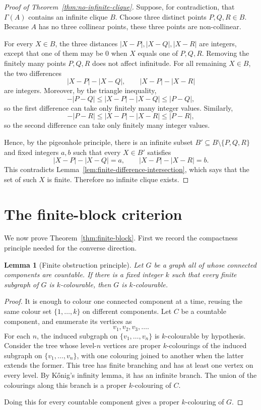 \documentclass[11pt,a4paper]{amsart}
\newtheorem{lemma}[theorem]{Lemma}
\theoremstyle{definition}
\begin{document}
\begin{proof}[Proof of Theorem~\ref{thm:no-infinite-clique}]
Suppose, for contradiction, that $\Gamma(A)$ contains an infinite clique $B$.  Choose three distinct points $P,Q,R\in B$.  Because $A$ has no three collinear points, these three points are non-collinear.

For every $X\in B$, the three distances $|X-P|,|X-Q|,|X-R|$ are integers, except that one of them may be $0$ when $X$ equals one of $P,Q,R$.  Removing the finitely many points $P,Q,R$ does not affect infinitude.  For all remaining $X\in B$, the two differences
\[
        |X-P|-|X-Q|,
        \qquad
        |X-P|-|X-R|
\]
are integers.  Moreover, by the triangle inequality,
\[
        -|P-Q|\leq |X-P|-|X-Q|\leq |P-Q|,
\]
so the first difference can take only finitely many integer values.  Similarly,
\[
        -|P-R|\leq |X-P|-|X-R|\leq |P-R|,
\]
so the second difference can take only finitely many integer values.

Hence, by the pigeonhole principle, there is an infinite subset $B'\subseteq B\setminus\{P,Q,R\}$ and fixed integers $a,b$ such that every $X\in B'$ satisfies
\[
        |X-P|-|X-Q|=a,
        \qquad
        |X-P|-|X-R|=b.
\]
This contradicts Lemma~\ref{lem:finite-difference-intersection}, which says that the set of such $X$ is finite.  Therefore no infinite clique exists.
\end{proof}

\section{The finite-block criterion}

We now prove Theorem~\ref{thm:finite-block}.  First we record the compactness principle needed for the converse direction.

\begin{lemma}[Finite obstruction principle]\label{lem:finite-obstruction}
Let $G$ be a graph all of whose connected components are countable.  If there is a fixed integer $k$ such that every finite subgraph of $G$ is $k$-colourable, then $G$ is $k$-colourable.
\end{lemma}

\begin{proof}
It is enough to colour one connected component at a time, reusing the same colour set $\{1,\ldots,k\}$ on different components.  Let $C$ be a countable component, and enumerate its vertices as
\[
        v_1,v_2,v_3,\ldots .
\]
For each $n$, the induced subgraph on $\{v_1,\ldots,v_n\}$ is $k$-colourable by hypothesis.  Consider the tree whose level-$n$ vertices are proper $k$-colourings of the induced subgraph on $\{v_1,\ldots,v_n\}$, with one colouring joined to another when the latter extends the former.  This tree has finite branching and has at least one vertex on every level.  By K\H{o}nig's infinity lemma, it has an infinite branch.  The union of the colourings along this branch is a proper $k$-colouring of $C$.

Doing this for every countable component gives a proper $k$-colouring of $G$.
\end{proof}
\end{document}
